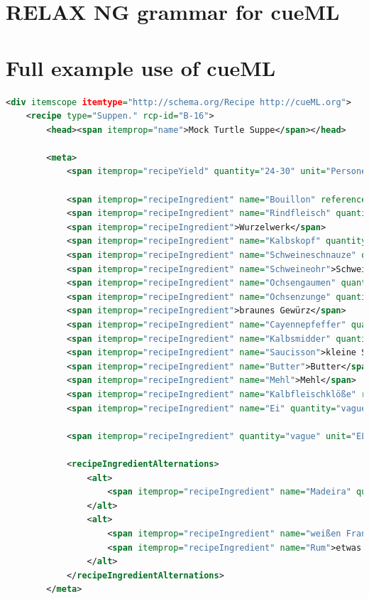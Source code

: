 \documentclass[12pt, twoside]{report}
\begin{document}
\chapter{RELAX NG grammar for cueML} \label{appendix:grammaCueML}


\chapter{Full example use of cueML} \label{appendix:fullUseOfCueML}
\begin{lstlisting}[language=XML]
<div itemscope itemtype="http://schema.org/Recipe http://cueML.org">
	<recipe type="Suppen." rcp-id="B-16">
		<head><span itemprop="name">Mock Turtle Suppe</span></head>
		
		<meta>
			<span itemprop="recipeYield" quantity="24-30" unit="Personen">24-30 Personen</span>
			
			<span itemprop="recipeIngredient" name="Bouillon" reference="#Bouillon">Bouillon</span>
			<span itemprop="recipeIngredient" name="Rindfleisch" quantity="8-10" unit="Pfund">8-10 Pfund Rindfleisch</span>
			<span itemprop="recipeIngredient">Wurzelwerk</span>
			<span itemprop="recipeIngredient" name="Kalbskopf" quantity="1">1 Kalbskopf</span>
			<span itemprop="recipeIngredient" name="Schweineschnauze" quantity="1">1 Schweineschnauze</span>
			<span itemprop="recipeIngredient" name="Schweineohr">Schweineohren</span>
			<span itemprop="recipeIngredient" name="Ochsengaumen" quantity="1">1 Ochsengaumen</span>
			<span itemprop="recipeIngredient" name="Ochsenzunge" quantity="1">1 geräucherte Ochsenzunge</span>
			<span itemprop="recipeIngredient">braunes Gewürz</span>
			<span itemprop="recipeIngredient" name="Cayennepfeffer" quantity="vague" unit="Messersptize">ein Paar Messerspitzen Cayenne-Pfeffer</span>
			<span itemprop="recipeIngredient" name="Kalbsmidder" quantity="vague" reference="#A-16">einige Kalbsmidder</span>
			<span itemprop="recipeIngredient" name="Saucisson">kleine Saucissen</span>
			<span itemprop="recipeIngredient" name="Butter">Butter</span>
			<span itemprop="recipeIngredient" name="Mehl">Mehl</span>
			<span itemprop="recipeIngredient" name="Kalbfleischklöße" reference="#L-4">Klöße vom Kalbfleisch</span>
			<span itemprop="recipeIngredient" name="Ei" quantity="vague">einige hart gekochte Eier</span>
			
			<span itemprop="recipeIngredient" quantity="vague" unit="EL" isOptional="True">ein Paar Eßlöffel Engl. Soja</span>
			
			<recipeIngredientAlternations>
				<alt>
					<span itemprop="recipeIngredient" name="Madeira" quantity="0.5" unit="Flasche">Madeira</span>
				</alt>
				<alt>
					<span itemprop="recipeIngredient" name="weißen Franzwein">weißen Franzwein</span>
					<span itemprop="recipeIngredient" name="Rum">etwas Rum</span>
				</alt>
			</recipeIngredientAlternations>
		</meta>


\end{lstlisting}
\end{document}
